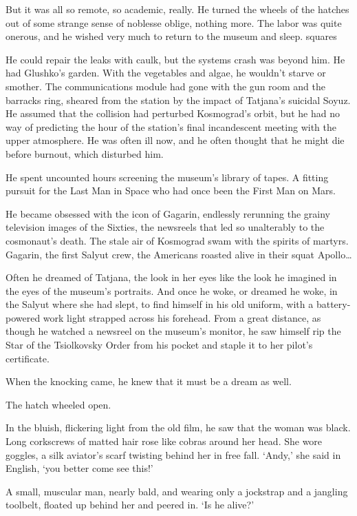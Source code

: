 But it was all so remote, so academic, really. He turned the wheels of the hatches out of some strange sense of noblesse oblige, nothing more. The labor was quite onerous, and he wished very much to return to the museum and sleep.
squares

He could repair the leaks with caulk, but the systems crash was beyond him. He had Glushko’s garden. With the vegetables and algae, he wouldn’t starve or smother. The communications module had gone with the gun room and the barracks ring, sheared from the station by the impact of Tatjana’s suicidal Soyuz. He assumed that the collision had perturbed Kosmograd’s orbit, but he had no way of predicting the hour of the station’s final incandescent meeting with the upper atmosphere. He was often ill now, and he often thought that he might die before burnout, which disturbed him.

He spent uncounted hours screening the museum’s library of tapes. A fitting pursuit for the Last Man in Space who had once been the First Man on Mars.

He became obsessed with the icon of Gagarin, endlessly rerunning the grainy television images of the Sixties, the newsreels that led so unalterably to the cosmonaut’s death. The stale air of Kosmograd swam with the spirits of martyrs. Gagarin, the first Salyut crew, the Americans roasted alive in their squat Apollo…

Often he dreamed of Tatjana, the look in her eyes like the look he imagined in the eyes of the museum’s portraits. And once he woke, or dreamed he woke, in the Salyut where she had slept, to find himself in his old uniform, with a battery-powered work light strapped across his forehead. From a great distance, as though he watched a newsreel on the museum’s monitor, he saw himself rip the Star of the Tsiolkovsky Order from his pocket and staple it to her pilot’s certificate.

When the knocking came, he knew that it must be a dream as well.

The hatch wheeled open.

In the bluish, flickering light from the old film, he saw that the woman was black. Long corkscrews of matted hair rose like cobras around her head. She wore goggles, a silk aviator’s scarf twisting behind her in free fall. ‘Andy,’ she said in English, ‘you better come see this!’

A small, muscular man, nearly bald, and wearing only a jockstrap and a jangling toolbelt, floated up behind her and peered in. ‘Is he alive?’

